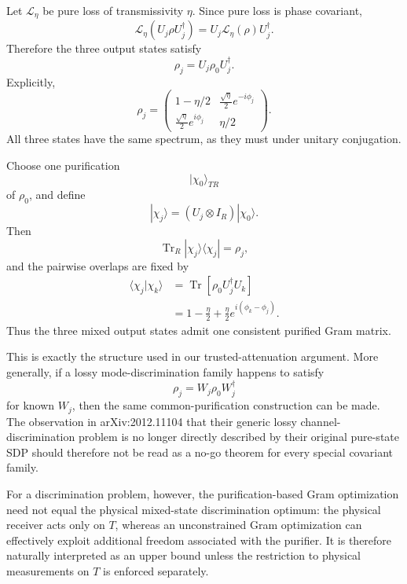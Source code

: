 \documentclass[11pt]{article}
\theoremstyle{remark}
\begin{document}
Let \(\mathcal L_\eta\) be pure loss of transmissivity \(\eta\).  Since pure
loss is phase covariant,
\[
    \mathcal L_\eta(U_j\rho U_j^\dagger)
    =
    U_j\mathcal L_\eta(\rho)U_j^\dagger.
\]
Therefore the three output states satisfy
\[
    \rho_j
    =
    U_j\rho_0U_j^\dagger.
\]
Explicitly,
\begin{equation}
    \rho_j
    =
    \begin{pmatrix}
        1-\eta/2
        &
        \frac{\sqrt{\eta}}{2}e^{-i\phi_j}
        \\[1mm]
        \frac{\sqrt{\eta}}{2}e^{i\phi_j}
        &
        \eta/2
    \end{pmatrix}.
    \label{eq:app-phase-orbit-rho}
\end{equation}
All three states have the same spectrum, as they must under unitary
conjugation.

Choose one purification
\[
    |\chi_0\rangle_{TR}
\]
of \(\rho_0\), and define
\[
    |\chi_j\rangle
    =
    (U_j\otimes I_R)|\chi_0\rangle.
\]
Then
\[
    \operatorname{Tr}_R|\chi_j\rangle\!\langle\chi_j|
    =
    \rho_j,
\]
and the pairwise overlaps are fixed by
\begin{align}
    \langle\chi_j|\chi_k\rangle
    &=
    \operatorname{Tr}
    \left[
      \rho_0U_j^\dagger U_k
    \right]
    \nonumber\\
    &=
    1-\frac{\eta}{2}
    +
    \frac{\eta}{2}
    e^{i(\phi_k-\phi_j)}.
    \label{eq:app-phase-orbit-overlap}
\end{align}
Thus the three mixed output states admit one consistent purified Gram matrix.

This is exactly the structure used in our trusted-attenuation argument.  More
generally, if a lossy mode-discrimination family happens to satisfy
\[
    \rho_j=W_j\rho_0W_j^\dagger
\]
for known \(W_j\), then the same common-purification construction can be made.
The observation in arXiv:2012.11104 that their generic lossy
channel-discrimination problem is no longer directly described by their
original pure-state SDP should therefore not be read as a no-go theorem for
every special covariant family.

For a discrimination problem, however, the purification-based Gram
optimization need not equal the physical mixed-state discrimination optimum:
the physical receiver acts only on \(T\), whereas an unconstrained Gram
optimization can effectively exploit additional freedom associated with the
purifier.  It is therefore naturally interpreted as an upper bound unless the
restriction to physical measurements on \(T\) is enforced separately.
\end{document}
